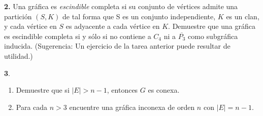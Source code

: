 \documentclass[12pt]{article}
\begin{document}
\vspace{1cm}

%
%
\textbf{2.} Una gráfica es \textit{escindible} completa si su conjunto de vértices admite una partición $(S, K)$
de tal forma que S es un conjunto independiente, $K$ es un clan, y cada vértice en $S$ es
adyacente a cada vértice en $K$. Demuestre que una gráfica es escindible completa si y
sólo si no contiene a $C_4$ ni a $\overline{P_3}$ como subgráfica inducida. (Sugerencia: Un ejercicio de
la tarea anterior puede resultar de utilidad.)
\vspace{1cm}

%
%
\textbf{3}.

\begin{enumerate}[label=\alph*)]

    \item Demuestre que si $\mid E \mid > n - 1$, entonces $G$ es conexa.
    \begin{tcolorbox}[title=\textbf{Hipotesis}, colback=red!15!white, colframe=black!]

    \end{tcolorbox}
    \begin{tcolorbox}[title=\textbf{Definiciones}, colback=blue!15!white, colframe=black!]
    
    \end{tcolorbox}

    \item Para cada $n > 3$ encuentre una gráfica inconexa de orden $n$ con $|E| = n - 1$.
    \begin{tcolorbox}[title=\textbf{Hipotesis}, colback=red!15!white, colframe=black!]

    \end{tcolorbox}
    \begin{tcolorbox}[title=\textbf{Definiciones}, colback=blue!15!white, colframe=black!]
    
    \end{tcolorbox}
\end{enumerate}
\end{document}
